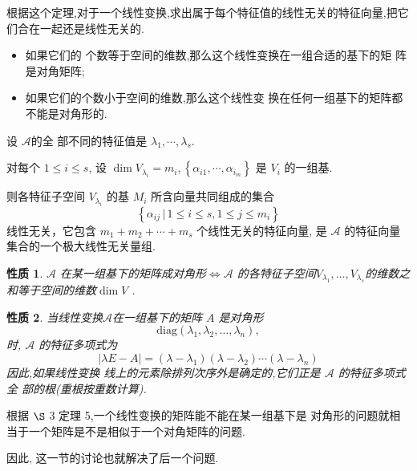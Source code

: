 \documentclass[13pt]{beamer}
\newtheorem*{prop}{性质}
\def\A{\mathscr{A}}
\begin{document}
\begin{frame}

根据这个定理,对于一个线性变换,求出属于每个特征值的线性无关的特征向量,把它们合在一起还是线性无关的.
\begin{itemize}
\item 如果它们的 个数等于空间的维数,那么这个线性变换在一组合适的基下的矩 阵是对角矩阵;
\item 如果它们的个数小于空间的维数,那么这个线性变 换在任何一组基下的矩阵都不能是对角形的.
\end{itemize}


\end{frame}

\begin{frame}
设 $\A$的全 部不同的特征值是 $\lambda_{1}, \cdots, \lambda_{s}$.
	
对每个 $1 \le  i \le  s$, 设 $\operatorname{dim} V_{\lambda_{i}}=m_{i},\left\{{\alpha}_{i 1}, \cdots, {\alpha}_{i_m}\right\}$ 是 $V_{i}$ 的一组基. 

则各特征子空间 $V_{\lambda_{i}}$ 的基 $M_{i}$ 所含向量共同组成的集合 $$\left\{ {\alpha}_{i j} \, | \, 1 \le i \le s , 1 \le j \le m_{i} \right\}$$
线性无关，它包含 $m_{1}+m_{2}+\cdots+m_{s}$ 个线性无关的特征向量, 是 $\A$ 的特征向量集合的一个极大线性无关量组.
 
 
\begin{prop}
	$\A$ 在某一组基下的矩阵成对角形$\Leftrightarrow  \A$ 的各特征子空间$V_{\lambda_{1}}, \ldots, V_{\lambda_{s}}$的维数之和等于空间的维数$\operatorname{dim}  V$ .
\end{prop}

\end{frame}


\begin{frame}

\begin{prop}
当线性变换$\A$在一组基下的矩阵 $A$ 是对角形
	$$\mbox{diag}\left(  \lambda_{1}, \lambda_{2}, \ldots, \lambda_{n} \right),$$
	时, $\A$ 的特征多项式为
	\[
	|\lambda{E}-{A}|=\left(\lambda-\lambda_{1}\right)\left(\lambda-\lambda_{2}\right) \cdots\left(\lambda-\lambda_{n}\right)
	\]
	因此,如果线性变换 
	线上的元素除排列次序外是确定的,它们正是 $\A$ 的特征多项式全 部的根(重根按重数计算). 
\end{prop}



 根据 $\S$ 3 定理 5,一个线性变换的矩阵能不能在某一组基下是 对角形的问题就相当于一个矩阵是不是相似于一个对角矩阵的问题.
 
 因此, 这一节的讨论也就解决了后一个问题.   
\end{frame}
\end{document}
